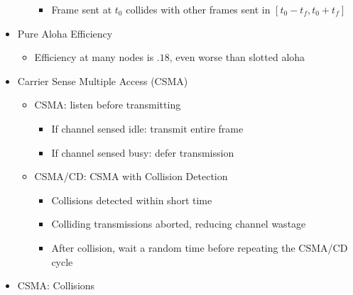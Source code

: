 \begin{itemize}
\begin{itemize}
\begin{itemize}
          \item Frame sent at $t_0$ collides with other frames sent in $[t_0-t_f, t_0+t_f]$

        \end{itemize}

    \end{itemize}

  \item Pure Aloha Efficiency

    \begin{itemize}

      \item Efficiency at many nodes is $.18$, even worse than slotted aloha

    \end{itemize}

  \item Carrier Sense Multiple Access (CSMA)

    \begin{itemize}

      \item CSMA: listen before transmitting

        \begin{itemize}

          \item If channel sensed idle: transmit entire frame

          \item If channel sensed busy: defer transmission

        \end{itemize}

      \item CSMA/CD: CSMA with Collision Detection

        \begin{itemize}

          \item Collisions detected within short time

          \item Colliding transmissions aborted, reducing channel wastage

          \item After collision, wait a random time before repeating the CSMA/CD cycle

        \end{itemize}

    \end{itemize}

  \item CSMA: Collisions


\end{itemize}
